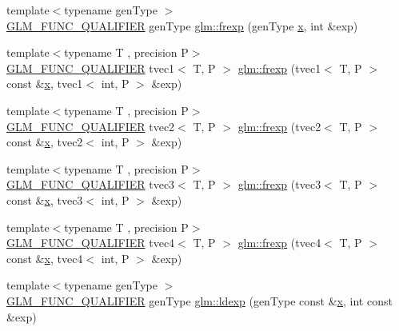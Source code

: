 \begin{DoxyCompactItemize}
\item 
{\footnotesize template$<$typename gen\+Type $>$ }\\\mbox{\hyperlink{setup_8hpp_a33fdea6f91c5f834105f7415e2a64407}{G\+L\+M\+\_\+\+F\+U\+N\+C\+\_\+\+Q\+U\+A\+L\+I\+F\+I\+ER}} gen\+Type \mbox{\hyperlink{namespaceglm_a90f422cea9e6e5c383bb69b593434c97}{glm\+::frexp}} (gen\+Type \mbox{\hyperlink{glad_8h_a92d0386e5c19fb81ea88c9f99644ab1d}{x}}, int \&exp)
\item 
{\footnotesize template$<$typename T , precision P$>$ }\\\mbox{\hyperlink{setup_8hpp_a33fdea6f91c5f834105f7415e2a64407}{G\+L\+M\+\_\+\+F\+U\+N\+C\+\_\+\+Q\+U\+A\+L\+I\+F\+I\+ER}} tvec1$<$ T, P $>$ \mbox{\hyperlink{namespaceglm_ae456a3da34aba807bf8e621573333e65}{glm\+::frexp}} (tvec1$<$ T, P $>$ const \&\mbox{\hyperlink{glad_8h_a92d0386e5c19fb81ea88c9f99644ab1d}{x}}, tvec1$<$ int, P $>$ \&exp)
\item 
{\footnotesize template$<$typename T , precision P$>$ }\\\mbox{\hyperlink{setup_8hpp_a33fdea6f91c5f834105f7415e2a64407}{G\+L\+M\+\_\+\+F\+U\+N\+C\+\_\+\+Q\+U\+A\+L\+I\+F\+I\+ER}} tvec2$<$ T, P $>$ \mbox{\hyperlink{namespaceglm_a0b0055e3fc459db5c3b7fa4acda93487}{glm\+::frexp}} (tvec2$<$ T, P $>$ const \&\mbox{\hyperlink{glad_8h_a92d0386e5c19fb81ea88c9f99644ab1d}{x}}, tvec2$<$ int, P $>$ \&exp)
\item 
{\footnotesize template$<$typename T , precision P$>$ }\\\mbox{\hyperlink{setup_8hpp_a33fdea6f91c5f834105f7415e2a64407}{G\+L\+M\+\_\+\+F\+U\+N\+C\+\_\+\+Q\+U\+A\+L\+I\+F\+I\+ER}} tvec3$<$ T, P $>$ \mbox{\hyperlink{namespaceglm_a2c2633f38fb9ba15eb5af40010b4fd93}{glm\+::frexp}} (tvec3$<$ T, P $>$ const \&\mbox{\hyperlink{glad_8h_a92d0386e5c19fb81ea88c9f99644ab1d}{x}}, tvec3$<$ int, P $>$ \&exp)
\item 
{\footnotesize template$<$typename T , precision P$>$ }\\\mbox{\hyperlink{setup_8hpp_a33fdea6f91c5f834105f7415e2a64407}{G\+L\+M\+\_\+\+F\+U\+N\+C\+\_\+\+Q\+U\+A\+L\+I\+F\+I\+ER}} tvec4$<$ T, P $>$ \mbox{\hyperlink{namespaceglm_a1e479592e7aa1e3e3193de5fdce9a2c1}{glm\+::frexp}} (tvec4$<$ T, P $>$ const \&\mbox{\hyperlink{glad_8h_a92d0386e5c19fb81ea88c9f99644ab1d}{x}}, tvec4$<$ int, P $>$ \&exp)
\item 
{\footnotesize template$<$typename gen\+Type $>$ }\\\mbox{\hyperlink{setup_8hpp_a33fdea6f91c5f834105f7415e2a64407}{G\+L\+M\+\_\+\+F\+U\+N\+C\+\_\+\+Q\+U\+A\+L\+I\+F\+I\+ER}} gen\+Type \mbox{\hyperlink{namespaceglm_a2632eefd82cbdf3ca860c41579a5ef9e}{glm\+::ldexp}} (gen\+Type const \&\mbox{\hyperlink{glad_8h_a92d0386e5c19fb81ea88c9f99644ab1d}{x}}, int const \&exp)

\end{DoxyCompactItemize}
